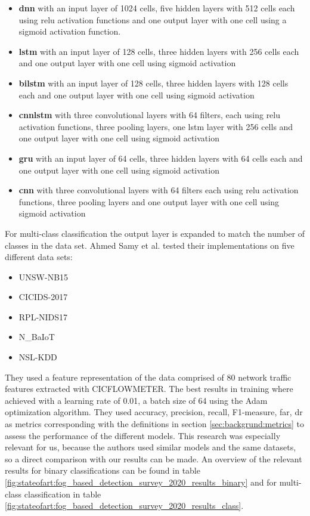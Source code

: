 \begin{itemize}
	\item \textbf{\gls{dnn}} with an input layer of 1024 cells, five hidden layers with 512 cells each using \gls{relu} activation functions and one output layer with one cell using a sigmoid activation function.
	\item \textbf{\gls{lstm}} with an input layer of 128 cells, three hidden layers with 256 cells each and one output layer with one cell using sigmoid activation 
	\item \textbf{\gls{bilstm}} with an input layer of 128 cells, three hidden layers with 128 cells each and one output layer with one cell using sigmoid activation
	\item \textbf{\gls{cnnlstm}} with three convolutional layers with 64 filters, each using \gls{relu} activation functions, three pooling layers, one \gls{lstm} layer with 256 cells and one output layer with one cell using sigmoid activation
	\item \textbf{\gls{gru}} with an input layer of 64 cells, three hidden layers with 64 cells each and one output layer with one cell using sigmoid activation
	\item \textbf{\gls{cnn}} with three convolutional layers with 64 filters each using \gls{relu} activation functions, three pooling layers and one output layer with one cell using sigmoid activation
\end{itemize}

For multi-class classification the output layer is expanded to match the number of classes in the data set. Ahmed Samy et al. tested their implementations on five different data sets:

\begin{itemize}
	\item UNSW-NB15 \cite{unsw_nb15}
	\item CICIDS-2017 \cite{cic_ids_2017}
	\item RPL-NIDS17 \cite{rpl_nids17}
	\item N\_BaIoT \cite{n_baiot}
	\item NSL-KDD \cite{nsl_kdd}
\end{itemize}

They used a feature representation of the data comprised of 80 network traffic features extracted with CICFLOWMETER. The best results in training where achieved with a learning rate of 0.01, a batch size of 64 using the Adam optimization algorithm. They used accuracy, precision, recall, F1-measure, \gls{far}, \gls{dr} as metrics corresponding with the definitions in section \ref{sec:backgrund:metrics} to assess the performance of the different models. This research was especially relevant for us, because the authors used similar models and the same datasets, so a direct comparison with our results can be made. An overview of the relevant results for binary classifications can be found in table \ref{fig:stateofart:fog_based_detection_survey_2020_results_binary} and for multi-class classification in table \ref{fig:stateofart:fog_based_detection_survey_2020_results_class}.

